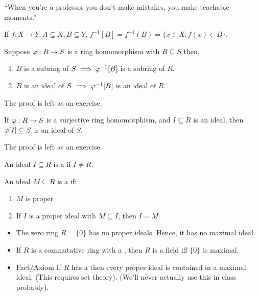 \documentclass[notes.tex]{subfiles}
\begin{document}
\begin{center}
``When you're a professor you don't make mistakes, you make teachable moments.''
\end{center}
\begin{defn}
	If $f:X\to Y, A\subseteq X, B\subseteq Y$, $f^{-1}[B] = f^{-1}(B) = \{x\in X : f(x) \in B\}$.
\end{defn}

\begin{proposition}
	Suppose $\varphi:R\to S$ is a ring homomorphism with $B\subseteq S$ then,
	\begin{enumerate}
		\item $B$ is a subring of $S\implies {\varphi}^{-1}[B]$ is a subring of $R$.
		\item $B$ is an ideal of $S\implies{\varphi}^{-1}[B]$ is an ideal of $R$.
	\end{enumerate}
\end{proposition}
The proof is left as an exercise.

\begin{proposition}
	If $\varphi:R\to S$ is a surjective ring homomorphism, and $I\subseteq R$ is an ideal, then $\varphi[I]\subseteq S$ is an ideal of $S$.
\end{proposition}
The proof is left as an exercise.

\begin{defn}
	An ideal $I\subseteq R$ is a  if $I \ne R$.
\end{defn}

\begin{defn}
	An ideal $M\subseteq R$ is a  if:
	\begin{enumerate}
		\item $M$ is proper
		\item If $I$ is a proper ideal with $M\subseteq I$, then $I=M$.
	\end{enumerate}
\end{defn}

\begin{remark}[(s)]
	\begin{itemize}
		\item The zero ring $R=\{0\}$ has no proper ideals. Hence, it has no maximal ideal.
		\item If $R$ is a commutative ring with a \one, then $R$ is a field iff $\{0\}$ is maximal.
		\item Fact/Axiom If $R$ has a \one then every proper ideal is contained in a maximal ideal. (This requires set theory). (We'll never actually use this in class probably).
	\end{itemize}
\end{remark}
\end{document}
